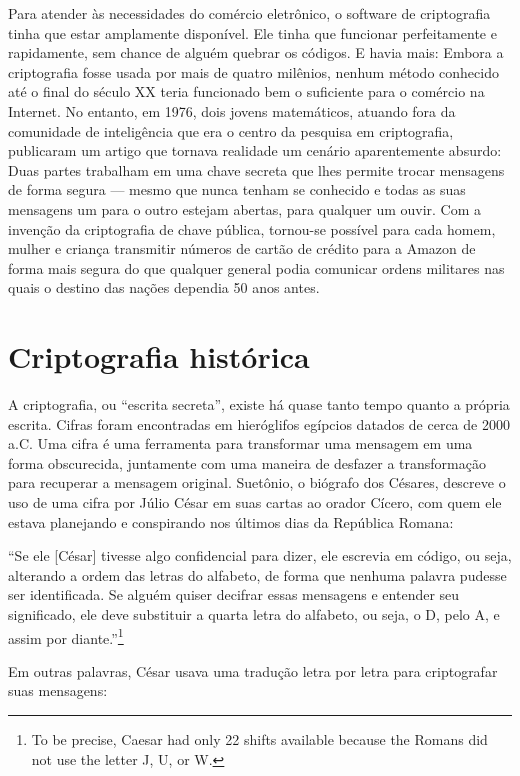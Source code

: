 \documentclass{book}
\begin{document}
Para atender às necessidades do comércio eletrônico, o software de criptografia tinha que estar amplamente disponível. Ele tinha que funcionar perfeitamente e rapidamente, sem chance de alguém quebrar os códigos. E havia mais: Embora a criptografia fosse usada por mais de quatro milênios, nenhum método conhecido até o final do século XX teria funcionado bem o suficiente para o comércio na Internet. No entanto, em 1976, dois jovens matemáticos, atuando fora da comunidade de inteligência que era o centro da pesquisa em criptografia, publicaram um artigo que tornava realidade um cenário aparentemente absurdo: Duas partes trabalham em uma chave secreta que lhes permite trocar mensagens de forma segura --- mesmo que nunca tenham se conhecido e todas as suas mensagens um para o outro estejam abertas, para qualquer um ouvir. Com a invenção da criptografia de chave pública, tornou-se possível para cada homem, mulher e criança transmitir números de cartão de crédito para a Amazon de forma mais segura do que qualquer general podia comunicar ordens militares nas quais o destino das nações dependia 50 anos antes.

\section{Criptografia histórica}
\label{segredos:historica}

A criptografia, ou ``escrita secreta'', existe há quase tanto tempo quanto a própria escrita. Cifras foram encontradas em hieróglifos egípcios datados de cerca de 2000 a.C. Uma cifra é uma ferramenta para transformar uma mensagem em uma forma obscurecida, juntamente com uma maneira de desfazer a transformação para recuperar a mensagem original. Suetônio, o biógrafo dos Césares, descreve o uso de uma cifra por Júlio César em suas cartas ao orador Cícero, com quem ele estava planejando e conspirando nos últimos dias da República Romana:

%
``Se ele [César] tivesse algo confidencial para dizer, ele escrevia em código, ou seja, alterando a ordem das letras do alfabeto, de forma que nenhuma palavra pudesse ser identificada. Se alguém quiser decifrar essas mensagens e entender seu significado, ele deve substituir a quarta letra do alfabeto, ou seja, o D, pelo A, e assim por diante.''\footnote{To be precise, Caesar had only 22 shifts available because the Romans did not use the letter J, U, or W.}
%

Em outras palavras, César usava uma tradução letra por letra para criptografar suas mensagens:
\end{document}
